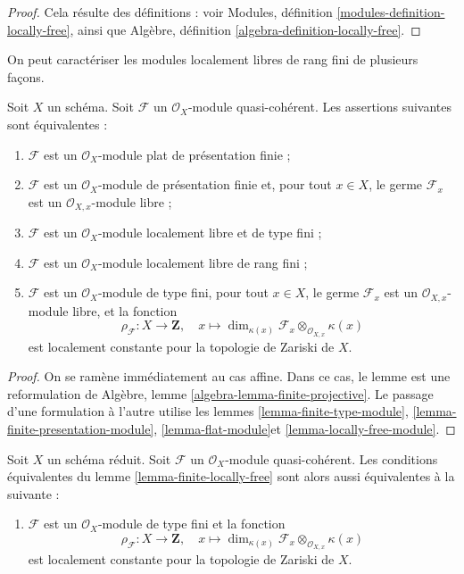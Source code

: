\begin{proof}
Cela résulte des définitions :
voir Modules, définition \ref{modules-definition-locally-free},
ainsi que
Algèbre, définition \ref{algebra-definition-locally-free}.
\end{proof}

\noindent
On peut caractériser les modules localement libres de rang fini de plusieurs façons.

\begin{lemma}
\label{lemma-finite-locally-free}
Soit $X$ un schéma.
Soit $\mathcal{F}$ un $\mathcal{O}_X$-module
quasi-cohérent. Les assertions suivantes sont équivalentes :
\begin{enumerate}
\item $\mathcal{F}$ est un $\mathcal{O}_X$-module plat de présentation finie ;
\item $\mathcal{F}$ est un $\mathcal{O}_X$-module de présentation finie et,
pour tout $x \in X$, le germe $\mathcal{F}_x$ est un
$\mathcal{O}_{X, x}$-module libre ;
\item $\mathcal{F}$ est un $\mathcal{O}_X$-module localement libre et de type fini ;
\item $\mathcal{F}$ est un $\mathcal{O}_X$-module localement libre de rang fini ;
\item $\mathcal{F}$ est un $\mathcal{O}_X$-module de type fini,
pour tout $x \in X$, le germe $\mathcal{F}_x$ est un
$\mathcal{O}_{X, x}$-module libre, et la fonction
$$
\rho_\mathcal{F} : X \to \mathbf{Z}, \quad
x \longmapsto
\dim_{\kappa(x)} \mathcal{F}_x \otimes_{\mathcal{O}_{X, x}} \kappa(x)
$$
est localement constante pour la topologie de Zariski de $X$.
\end{enumerate}
\end{lemma}

\begin{proof}
On se ramène immédiatement au cas affine. Dans
ce cas, le lemme est une reformulation de
Algèbre, lemme \ref{algebra-lemma-finite-projective}.
Le passage d'une formulation à l'autre
utilise les lemmes \ref{lemma-finite-type-module},
\ref{lemma-finite-presentation-module},
\ref{lemma-flat-module}et
\ref{lemma-locally-free-module}.
\end{proof}

\begin{lemma}
\label{lemma-finite-locally-free-reduced}
Soit $X$ un schéma réduit. Soit $\mathcal{F}$ un
$\mathcal{O}_X$-module quasi-cohérent. Les conditions équivalentes du
lemme \ref{lemma-finite-locally-free} sont alors aussi équivalentes à la suivante :
\begin{enumerate}
\item[(6)] $\mathcal{F}$ est un $\mathcal{O}_X$-module de type fini et
la fonction
$$
\rho_\mathcal{F} : X \to \mathbf{Z}, \quad
x \longmapsto
\dim_{\kappa(x)} \mathcal{F}_x \otimes_{\mathcal{O}_{X, x}} \kappa(x)
$$
est localement constante pour la topologie de Zariski de $X$.
\end{enumerate}
\end{lemma}

